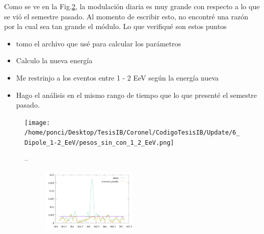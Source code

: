 Como se ve en la Fig.\ref{fig:label}, la modulación diaria es muy grande con respecto a  lo que se vió el semestre pasado. Al momento de escribir esto, no encontré una razón por la cual sea tan grande el módulo. Lo que verifiqué son estos puntos

\begin{itemize}
	\item tomo el archivo que usé para calcular los parámetros
	\item Calculo la nueva energía
	\item Me restrinjo a los eventos entre 1 - 2 EeV según la energía nueva
	\item Hago el análisis en el mismo rango de tiempo que lo que presenté el semestre pasado.
\end{itemize}

\begin{figure}[htbp]
	\centering
	\texttt{[image: /home/ponci/Desktop/TesisIB/Coronel/CodigoTesisIB/Update/6\_Dipole\_1-2\_EeV/pesos\_sin\_con\_1\_2\_EeV.png]}
	\caption{Rayleigh con todos los disparos y la corrección de la colaboración}
	\label{fig:sucio}
--
\begin{figure}[H]
	\centering
	\includegraphics[width=0.5\textwidth]{sucio.pdf}
	\caption{ }
	\label{fig:label}
\end{figure}

\end{figure}